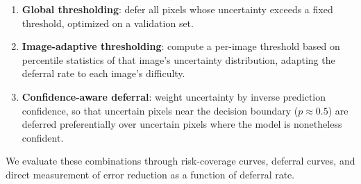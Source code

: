 \begin{enumerate}[leftmargin=*]
  \item \textbf{Global thresholding}: defer all pixels whose uncertainty
  exceeds a fixed threshold, optimized on a validation set.
  \item \textbf{Image-adaptive thresholding}: compute a per-image threshold
  based on percentile statistics of that image's uncertainty distribution,
  adapting the deferral rate to each image's difficulty.
  \item \textbf{Confidence-aware deferral}: weight uncertainty by inverse
  prediction confidence, so that uncertain pixels near the decision
  boundary ($p \approx 0.5$) are deferred preferentially over uncertain
  pixels where the model is nonetheless confident.
\end{enumerate}

We evaluate these combinations through risk-coverage curves, deferral
curves, and direct measurement of error reduction as a function of
deferral rate.

